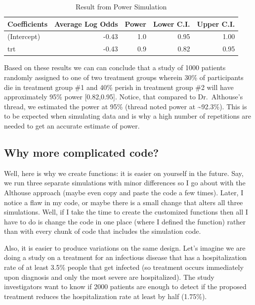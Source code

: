 \documentclass[
]{book}
\begin{document}
\begin{table}

\caption{\label{tab:unnamed-chunk-319}Result from Power Simulation}
\centering
\begin{tabular}[t]{l|r|r|r|r}
\hline
Coefficients & Average Log Odds & Power & Lower C.I. & Upper C.I.\\
\hline
(Intercept) & -0.43 & 1.0 & 0.95 & 1.00\\
\hline
trt & -0.43 & 0.9 & 0.82 & 0.95\\
\hline
\end{tabular}
\end{table}

Based on these results we can can conclude that a study of 1000 patients randomly assigned to one of two treatment groups wherein 30\% of participants die in treatment group \#1 and 40\% perish in treatment group \#2 will have approximately 95\% power {[}0.82,0.95{]}. Notice, that compared to Dr.~Althouse's thread, we estimated the power at 95\% (thread noted power at \textasciitilde92.3\%). This is to be expected when simulating data and is why a high number of repetitions are needed to get an accurate estimate of power.

\hypertarget{why-more-complicated-code}{%
\subsection{Why more complicated code?}\label{why-more-complicated-code}}

Well, here is why we create functions: it is easier on yourself in the future. Say, we run three separate simulations with minor differences so I go about with the Althouse approach (maybe even copy and paste the code a few times). Later, I notice a flaw in my code, or maybe there is a small change that alters all three simulations. Well, if I take the time to create the customized functions then all I have to do is change the code in one place (where I defined the function) rather than with every chunk of code that includes the simulation code.

Also, it is easier to produce variations on the same design. Let's imagine we are doing a study on a treatment for an infectious disease that has a hospitalization rate of at least 3.5\% people that get infected (so treatment occurs immediately upon diagnosis and only the most severe are hospitalized). The study investigators want to know if 2000 patients are enough to detect if the proposed treatment reduces the hospitalization rate at least by half (1.75\%).
\end{document}

